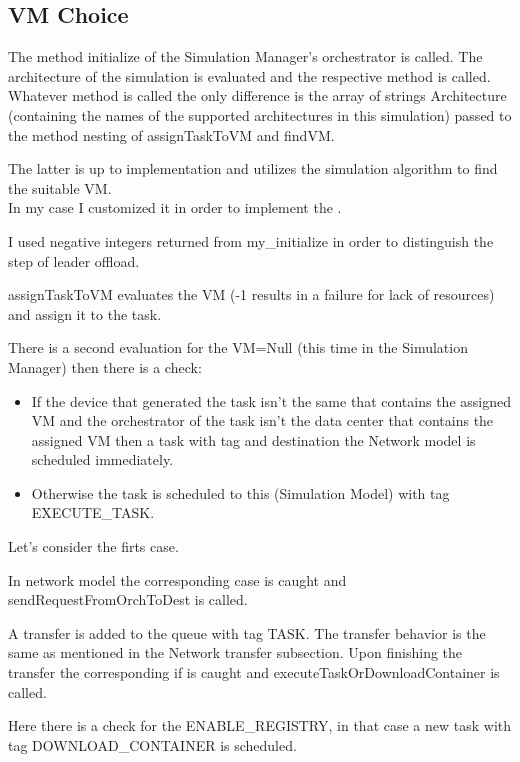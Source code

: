 \documentclass[12pt]{report}
\begin{document}
\subsection*{VM Choice}
The method initialize of the Simulation Manager's orchestrator is called. The architecture of the simulation is evaluated and the respective method is called. Whatever method is called the only difference is the array of strings Architecture (containing the names of the supported architectures in this simulation) passed to the method nesting of assignTaskToVM and findVM.

The latter is up to implementation and utilizes the simulation algorithm to find the suitable VM.\\
In my case I customized it in order to implement the .

I used negative integers returned from my\_initialize in order to distinguish the step of leader offload.

assignTaskToVM evaluates the VM (-1 results in a failure for lack of resources) and assign it to the task. 

\vspace{0.5cm}
There is a second evaluation for the VM=Null (this time in the Simulation Manager) then there is a check:
\begin{itemize}
	\item If the device that generated the task isn't the same that contains the assigned VM and the orchestrator of the task isn't the data center that contains the assigned VM then a task with tag  and destination the Network model is scheduled immediately.
	\item Otherwise the task is scheduled to this (Simulation Model) with tag EXECUTE\_TASK.
\end{itemize}
Let's consider the firts case.

In network model the corresponding case is caught and sendRequestFromOrchToDest is called.

A transfer is added to the queue with tag TASK. The transfer behavior is the same as mentioned in the Network transfer subsection. %
Upon finishing the transfer the corresponding if is caught and executeTaskOrDownloadContainer is called.

Here there is a check for the ENABLE\_REGISTRY, in that case a new task with tag DOWNLOAD\_CONTAINER is scheduled.
\end{document}
